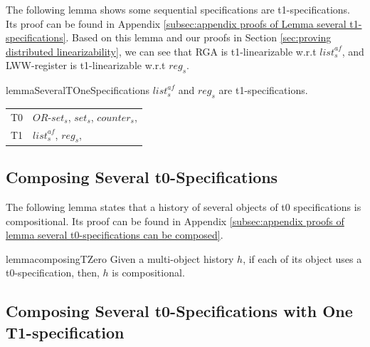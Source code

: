 {The following lemma shows some sequential specifications are t1-specifications. Its proof can be found in Appendix \ref{subsec:appendix proofs of Lemma several t1-specifications}. Based on this lemma and our proofs in Section \ref{sec:proving distributed linearizability}, we can see that RGA is t1-linearizable w.r.t $\mathit{list}_s^{\mathit{af}}$, and LWW-register is t1-linearizable w.r.t $\mathit{reg}_s$.

\begin{restatable}{lemma}{SeveralTOneSpecifications}
\label{lemma:several t1-specifications}
$\mathit{list}_s^{\mathit{af}}$ and $\mathit{reg}_s$ are t1-specifications.
\end{restatable}


\begin{table}
  \centering
  \begin{tabular}[t]{l|l}
    T0 & $\mathit{OR}$-$\mathit{set}_s$, $\mathit{set}_s$, $\mathit{counter}_s$,  \\
    T1 & $\mathit{list}_s^{\mathit{af}}$, $\mathit{reg}_s$,
  \end{tabular}
\end{table}




\subsection{Composing Several t0-Specifications}
\label{lemma:several t0-specifications can be composed}

The following lemma states that a history of several objects of t0 specifications is compositional. Its proof can be found in Appendix \ref{subsec:appendix proofs of lemma several t0-specifications can be composed}.

\begin{restatable}{lemma}{composingTZero}
\label{lemma:several t0-specifications can be composed}
Given a multi-object history $h$, if each of its object uses a t0-specification, then, $h$ is compositional.
\end{restatable}




\subsection{Composing Several t0-Specifications with One T1-specification}
\label{lemma:composing several t0-specification with one t1-specification}

}
